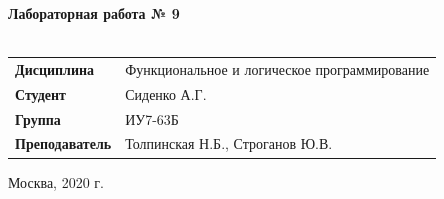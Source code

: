 \documentclass[a4paper,14pt]{extreport} %
\begin{document}
\begin{titlepage}
    \vspace{4cm}

    \begin{center}
        \textbf{Лабораторная работа № 9} \\
        \vspace{0.5cm}
        \textbf{} \\
    \end{center}

    \vspace{4cm}

    \begin{flushleft}
        \begin{tabular}{ll}
            \textbf{Дисциплина} & Функциональное и логическое программирование \\
            \textbf{Студент} & Сиденко А.Г. \\
            \textbf{Группа} & ИУ7-63Б \\
            \textbf{Преподаватель} & Толпинская Н.Б., Строганов Ю.В.  \\
        \end{tabular}
    \end{flushleft}

    \vspace{4cm}

   \begin{center}
        Москва, 2020 г.
    \end{center}

\end{titlepage}
\end{document}
